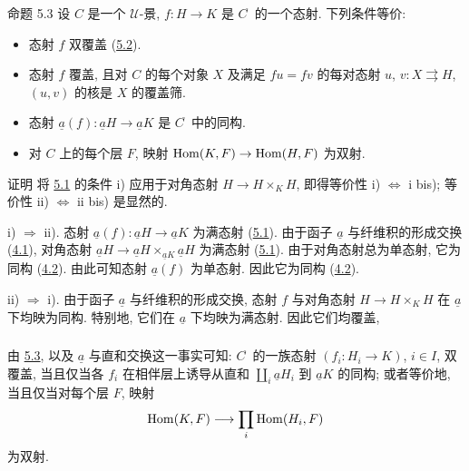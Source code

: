\begin{enonce*}{命题 5.3}
设 $C$ 是一个 $𝒰$-景,
$f:H\rightarrow K$ 是 $C^{\widehat{\phantom{,}}}$ 的一个态射.
下列条件等价:
\begin{itemize}
\item[i)] 态射 $f$ 双覆盖 (\hyperref[II.def5.2]{5.2}).

\item[i bis)] 态射 $f$ 覆盖,
且对 $C$ 的每个对象 $X$ 及满足 $fu=fv$ 的每对态射
$u$, $v:X\rightrightarrows H$,
$(u,v)$ 的核是 $X$ 的覆盖筛.

\item[ii)] 态射
$\underline{a}(f):\underline{a}H\to \underline{a}K$
是 $C^{\widetilde{\phantom{,}}}$ 中的同构.

\item[ii bis)] 对 $C$ 上的每个层 $F$,
映射 $\operatorname{Hom}(K,F)\rightarrow \operatorname{Hom}(H,F)$ 为双射.
\end{itemize}
\end{enonce*}

\begin{enonce*}[remark]{证明}
将 \hyperref[II.prop5.1]{5.1} 的条件 i)
应用于对角态射 $H\rightarrow H\times_K H$,
即得等价性 i) $\Leftrightarrow$ i bis);
等价性 ii) $\Leftrightarrow$ ii bis) 是显然的.

\noindent i) $\Rightarrow$ ii).
态射 $\underline{a}(f):\underline{a}H\rightarrow \underline{a}K$
为满态射 (\hyperref[II.prop5.1]{5.1}).
由于函子 $\underline{a}$ 与纤维积的形成交换
(\hyperref[II.theo4.1]{4.1}), 对角态射
$\underline{a}H\rightarrow
\underline{a}H\times_{\underline{a}K}\underline{a}H$
为满态射 (\hyperref[II.prop5.1]{5.1}).
由于对角态射总为单态射, 它为同构 (\hyperref[II.prop4.2]{4.2}).
由此可知态射 $\underline{a}(f)$ 为单态射.
因此它为同构 (\hyperref[II.prop4.2]{4.2}).

\noindent ii) $\Rightarrow$ i).
由于函子 $\underline{a}$ 与纤维积的形成交换,
态射 $f$ 与对角态射 $H\rightarrow H\times_K H$
在 $\underline{a}$ 下均映为同构.
特别地, 它们在 $\underline{a}$ 下均映为满态射.
因此它们均覆盖, \cqfd
\end{enonce*}

\setcounter{subsection}{3} \setcounter{subsubsection}{0}



\subsubsection{}
由\pageoriginale{} \hyperref[II.prop5.3]{5.3},
以及 $\underline{a}$ 与直和交换这一事实可知:
$C^{\widehat{\phantom{,}}}$ 的一族态射
$(f_i:H_i\rightarrow K)$, $i\in I$, 双覆盖,
当且仅当各 $f_i$ 在相伴层上诱导从直和
$\amalg_i \underline{a}H_i$ 到 $\underline{a}K$ 的同构;
或者等价地, 当且仅当对每个层 $F$, 映射
$$
\operatorname{Hom}(K,F)\longrightarrow \prod_i \operatorname{Hom}(H_i,F)
$$
为双射.

